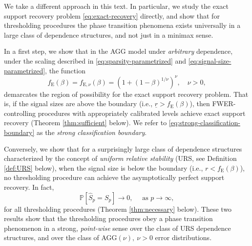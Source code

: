 We take a different approach in this text. 
In particular, we study the exact support recovery problem \eqref{eq:exact-recovery} directly, and show that for thresholding procedures the phase transition phenomena exists {universally} in a large class of dependence structures, and not just in a minimax sense.

In a first step, we show that in the AGG model under \emph{arbitrary} dependence, under the scaling described in \eqref{eq:sparsity-parametrized} and \eqref{eq:signal-size-parametrized}, the function
\begin{equation} \label{eq:strong-classification-boundary}
    f_{\mathrm{E}}(\beta) = f_{\mathrm{E},\nu}(\beta) = (1 + (1 - \beta)^{1/\nu})^\nu, \quad \nu>0,
\end{equation}
demarcates the region of possibility for the exact support recovery problem.
That is, if the signal sizes are above the boundary (i.e., $\underline{r}> f_{\mathrm{E}}(\beta)$), then \ac{FWER}-controlling procedures with appropriately calibrated levels achieve exact support recovery (Theorem \ref{thm:sufficient} below).
We refer to \eqref{eq:strong-classification-boundary} as the {\em strong classification boundary}.

Conversely, we show that for a surprisingly large class of dependence structures characterized by the concept of \emph{uniform relative stability} (URS, see Definition \ref{def:URS} below), when the signal size is below the boundary  (i.e., $r<f_{\mathrm{E}}(\beta)$), no thresholding procedure can achieve the asymptotically perfect support recovery. In fact,
\begin{equation} \label{eq:exact-recovery-failure}
    \mathbb{P}\left[\widehat{S}_p=S_p\right]\longrightarrow 0,\quad \mbox{ as }p\to \infty,
\end{equation}
for all thresholding procedures (Theorem \ref{thm:necessary} below).
These two results show that the thresholding procedures obey a phase transition phenomenon in a strong, \emph{point-wise} sense over the class of URS dependence structures, and over the class of AGG$(\nu),\ \nu>0$ error distributions. 



